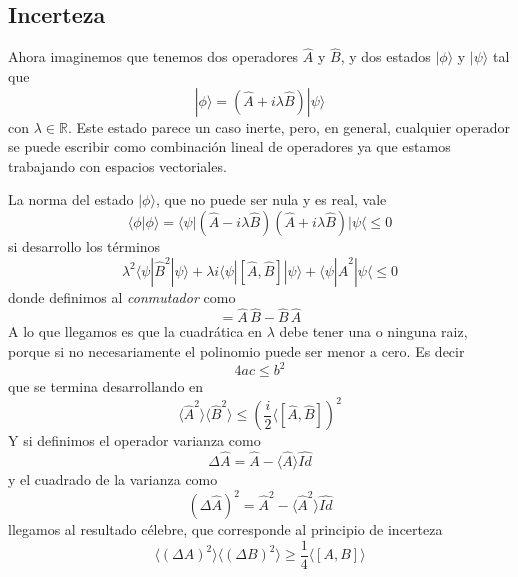 \subsection{Incerteza}

Ahora imaginemos que tenemos dos operadores $\hat{A}$ y $\hat{B}$, y dos estados $|\phi\rangle$ y $|\psi\rangle$ tal que
\[ |\phi\rangle = (\hat{A} + i \lambda \hat{B}) |\psi\rangle\]
con $\lambda \in \mathbb{R}$.
Este estado parece un caso inerte, pero, en general, cualquier operador se puede escribir como combinación lineal  de operadores ya que estamos trabajando con espacios vectoriales.

La norma del estado $|\phi\rangle$, que no puede ser nula y es real, vale
\[ \langle \phi | \phi \rangle = \langle \psi | (\hat{A} - i \lambda \hat{B}) (\hat{A} + i \lambda \hat{B})|\psi\langle \leq 0\]
si desarrollo los términos
\[ \lambda^2 \langle \psi | \hat{B}^2 |\psi \rangle + \lambda i \langle \psi | [\hat{A},\hat{B}] |\psi \rangle + \langle \psi | \hat{A}^2 | \psi \langle \leq 0 \]
donde definimos al \emph{conmutador} como
\begin{equation}
    [\hat{A},\hat{B}] = \hat{A}\,\hat{B} - \hat{B}\,\hat{A}
  \label{eq:conmutador}
\end{equation}
A lo que llegamos es que la cuadrática en $\lambda$ debe tener una o ninguna raiz, porque si no necesariamente el polinomio puede ser menor a cero.
Es decir
\[ 4 a c \leq b^2 \]
que se termina desarrollando en
\begin{equation}
    \langle \hat{A}^2 \rangle \langle \hat{B}^2 \rangle \leq \left(\frac{i}{2} \langle [\hat{A},\hat{B}] \right)^2
\end{equation}
Y si definimos el operador varianza como
\begin{equation}
    \Delta \hat{A} = \hat{A} - \langle \hat{A} \rangle \hat{Id}
\end{equation}
y el cuadrado de la varianza como
\begin{equation}
    (\Delta \hat{A})^2 = \hat{A}^2 - \langle \hat{A}^2 \rangle \hat{Id}
\end{equation}
llegamos al resultado célebre, que corresponde al principio de incerteza
\begin{equation}
  \langle(\Delta A)^2\rangle \langle(\Delta B)^2\rangle \geq \frac{1}{4} \langle [A, B] \rangle
\end{equation}


